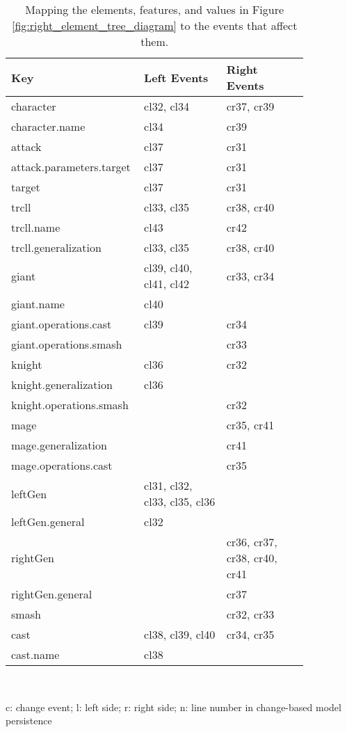 \begin{table*}[ht]
  \centering
  \caption{Mapping the elements, features, and values in Figure \ref{fig:right_element_tree_diagram} to the events that affect them.}
  \label{tab:keyeventsmap}
  \begin{scriptsize}
    \begin{sffamily}
      \begin{tabular}{|m{0.30\linewidth}|m{0.275\linewidth}|m{0.275\linewidth}|}
        \hline
        \textbf{Key} & \textbf{Left Events} & \textbf{Right Events} \\ \hline
        character & cl32, cl34 & cr37, cr39 \\ \hline
        character.name & cl34 & cr39 \\ \hline
        attack & cl37 & cr31 \\ \hline
        attack.parameters.target & cl37 & cr31 \\ \hline
        target & cl37 & cr31 \\ \hline
        trcll & cl33, cl35 & cr38, cr40 \\ \hline
        trcll.name & cl43 & cr42 \\ \hline
        trcll.generalization & cl33, cl35 & cr38, cr40 \\ \hline
        giant & cl39, cl40, cl41, cl42 & cr33, cr34 \\ \hline
        giant.name & cl40 & \\ \hline
        giant.operations.cast & cl39 & cr34 \\ \hline
        giant.operations.smash & & cr33 \\ \hline
        knight & cl36 & cr32 \\ \hline
        knight.generalization & cl36 & \\ \hline
        knight.operations.smash & & cr32 \\ \hline
        mage & & cr35, cr41 \\ \hline
        mage.generalization & & cr41 \\ \hline
        mage.operations.cast & & cr35 \\ \hline
        leftGen & cl31, cl32, cl33, cl35, cl36 & \\ \hline
        leftGen.general & cl32 & \\ \hline
        rightGen & & cr36, cr37, cr38, cr40, cr41 \\ \hline
        rightGen.general & & cr37 \\ \hline
        smash & & cr32, cr33 \\ \hline
        cast & cl38, cl39, cl40 & cr34, cr35 \\ \hline
        cast.name & cl38 & \\ \hline
      \end{tabular}\\
    \end{sffamily}
    c: change event; l: left side; r: right side; n: line number in change-based model persistence
  \end{scriptsize}
\end{table*}

